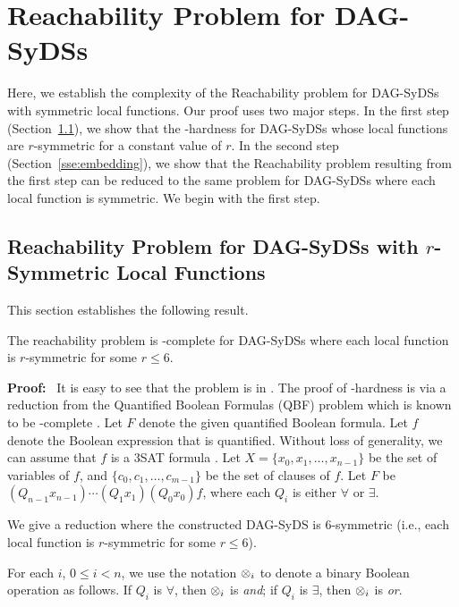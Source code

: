 \section{Reachability Problem for DAG-SyDSs}
\label{sec:reachability}

Here, we establish the complexity
of the Reachability problem for
DAG-SyDSs with symmetric local functions. 
Our proof uses two major steps.
In the first step (Section~\ref{sse:hardness_six_sym}),
we show that the \cpsp-hardness for DAG-SyDSs whose local
functions are $r$-symmetric for a constant value of $r$.
In the second step (Section~\ref{sse:embedding}), we show
that the Reachability problem resulting from the first step
can be reduced to the same problem for DAG-SyDSs where each
local function is symmetric.
We begin with the first step.

\subsection{Reachability Problem for DAG-SyDSs with $r$-Symmetric
Local Functions}
\label{sse:hardness_six_sym}

This section establishes the following result.

\begin{theorem}\label{thm:reach-six-sym}
The reachability problem is \cpsp-complete for DAG-SyDSs
where each local function is $r$-symmetric for some $r \leq 6$.
\end{theorem}

\noindent
\textbf{Proof:}~ It is easy to see that the problem is in \cpsp. 
The proof of \cpsp-hardness is via a reduction from 
the Quantified Boolean Formulas (QBF) problem
which is known to be \cpsp-complete \cite{GJ-1979}.
Let $F$ denote the given quantified Boolean formula.
Let $f$ denote the Boolean expression that is quantified.
Without loss of generality, we can assume that $f$ 
is a 3SAT formula \cite{GJ-1979}.
Let $X = \{x_0, x_1, \dots , x_{n-1}\}$ be the set of variables of $f$,
and $\{c_0, c_1, \dots , c_{m-1}\}$ be the set of clauses of $f$.
Let $F$ be $(Q_ {n-1} x_{n-1}) \cdots (Q_1 x_1) (Q_0 x_0) f$,
where each $Q_i$ is either $\forall$ or $\exists$.       

We give a reduction where the constructed DAG-SyDS is 6-symmetric
(i.e., each local function is $r$-symmetric for some $r \leq 6$).

For each $i$, $0 \leq i <n$,
 we use the notation $\mbox{$\otimes$}_i$ to denote a binary Boolean operation as follows.
 If $Q_i$ is $\forall$, then $\mbox{$\otimes$}_i$ is {\em and};
 if $Q_i$ is $\exists$, then $\mbox{$\otimes$}_i$ is {\em or}.

